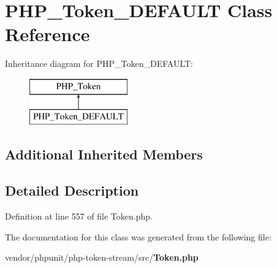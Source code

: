 \section{P\+H\+P\+\_\+\+Token\+\_\+\+D\+E\+F\+A\+U\+L\+T Class Reference}
\label{class_p_h_p___token___d_e_f_a_u_l_t}
Inheritance diagram for P\+H\+P\+\_\+\+Token\+\_\+\+D\+E\+F\+A\+U\+L\+T\+:\begin{figure}[H]
\begin{center}
\leavevmode
\includegraphics[height=2.000000cm]{class_p_h_p___token___d_e_f_a_u_l_t}
\end{center}
\end{figure}
\subsection*{Additional Inherited Members}


\subsection{Detailed Description}


Definition at line 557 of file Token.\+php.



The documentation for this class was generated from the following file\+:\begin{DoxyCompactItemize}
\item 
vendor/phpunit/php-\/token-\/stream/src/{\bf Token.\+php}\end{DoxyCompactItemize}
